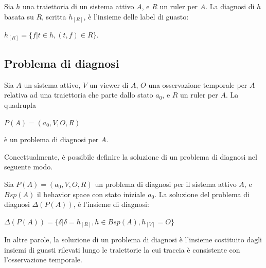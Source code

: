 \begin{defn}
Sia $h$ una traiettoria di un sistema attivo $A$, e $R$ un ruler per $A$. La diagnosi di $h$ basata su $R$, scritta $h_{[R]}$, è l'insieme delle label di guasto:
\begin{center}
	$h_{[R]} = \{ f | t \in h, (t,f) \in R \}$.
\end{center}
\end{defn}

\subsection{Problema di diagnosi}
\begin{defn}
Sia $A$ un sistema attivo, $V$ un viewer di $A$, $O$ una osservazione temporale per $A$ relativa ad una traiettoria che parte dallo stato $a_0$, e $R$ un ruler per $A$. La quadrupla
\begin{center}
	$P(A) = (a_0,V,O,R)$
\end{center}
è un problema di diagnosi per $A$.
\end{defn}
Concettualmente, è possibile definire la soluzione di un problema di diagnosi nel seguente modo.
\begin{defn}
Sia $P(A) = (a_0,V,O,R)$ un problema di diagnosi per il sistema attivo $A$, e $Bsp(A)$ il behavior space con stato iniziale $a_0$. La soluzione del problema di diagnosi $\Delta(P(A))$, è l'insieme di diagnosi:
\begin{center}
	$\Delta(P(A)) = \{ \delta | \delta = h_{[R]}, h \in Bsp(A), h_{[V]} = O\}$
\end{center}
\end{defn}
In altre parole, la soluzione di un problema di diagnosi è l'insieme costituito dagli insiemi di guasti rilevati lungo le traiettorie la cui traccia è consistente con l'osservazione temporale.


\newpage
